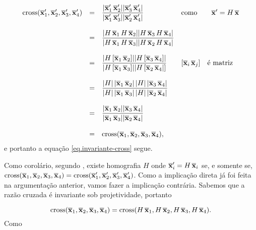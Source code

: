 \begin{equation*}
\begin{array}{rcll}
\text{cross}(\overline{\mathbf{x}}'_1,\overline{\mathbf{x}}'_2,\overline{\mathbf{x}}'_3,\overline{\mathbf{x}}'_4)&=&\displaystyle\frac{|\overline{\mathbf{x}}'_1\,\overline{\mathbf{x}}'_2||\overline{\mathbf{x}}'_3\,\overline{\mathbf{x}}'_4|}{|\overline{\mathbf{x}}'_1\,\overline{\mathbf{x}}'_3||\overline{\mathbf{x}}'_2\,\overline{\mathbf{x}}'_4|}&\text{como}\qquad\overline{\mathbf{x}}'=H\,\overline{\mathbf{x}}\\\\
&=&
\displaystyle\frac{|H\,\overline{\mathbf{x}}_1\,H\,\overline{\mathbf{x}}_2||H\,\overline{\mathbf{x}}_3\,H\,\overline{\mathbf{x}}_4|}{|H\,\overline{\mathbf{x}}_1\,H\,\overline{\mathbf{x}}_3||H\,\overline{\mathbf{x}}_2\,H\,\overline{\mathbf{x}}_4|}&\\\\
&=&
\displaystyle\frac{|H\,[\overline{\mathbf{x}}_1\,\overline{\mathbf{x}}_2]||H\,[\overline{\mathbf{x}}_3\,\overline{\mathbf{x}}_4]|}{|H\,[\overline{\mathbf{x}}_1\,\overline{\mathbf{x}}_3]||H\,[\overline{\mathbf{x}}_2\,\overline{\mathbf{x}}_4|]}&[\overline{\mathbf{x}}_i\,\overline{\mathbf{x}}_j]\quad\text{é matriz}      \\\\
&=&
\displaystyle\frac{|H|\,|\overline{\mathbf{x}}_1\,\overline{\mathbf{x}}_2|\,|H|\,|\overline{\mathbf{x}}_3\,\overline{\mathbf{x}}_4|}{|H|\,|\overline{\mathbf{x}}_1\,\overline{\mathbf{x}}_3|\,|H|\,|\overline{\mathbf{x}}_2\,\overline{\mathbf{x}}_4|}&\\\\
&=&
\displaystyle\frac{|\overline{\mathbf{x}}_1\,\overline{\mathbf{x}}_2||\overline{\mathbf{x}}_3\,\overline{\mathbf{x}}_4|}{|\overline{\mathbf{x}}_1\,\overline{\mathbf{x}}_3||\overline{\mathbf{x}}_2\,\overline{\mathbf{x}}_4|}&\\\\
&=&
\text{cross}(\overline{\mathbf{x}}_1,\overline{\mathbf{x}}_2,\overline{\mathbf{x}}_3,\overline{\mathbf{x}}_4),
\end{array}
\end{equation*}
e portanto a equação \ref{eq.invariante-cross} segue.

Como corolário, segundo \cite{kneebone}, existe homografia $H$ onde $\overline{\mathbf{x}}'_i=H\,\overline{\mathbf{x}}_i$ se, e somente se, $\text{cross}(\overline{\mathbf{x}}_1,\overline{\mathbf{x}}_2,\overline{\mathbf{x}}_3,\overline{\mathbf{x}}_4)=\text{cross}(\overline{\mathbf{x}}'_1,\overline{\mathbf{x}}'_2,\overline{\mathbf{x}}'_3,\overline{\mathbf{x}}'_4)$. Como a implicação direta já foi feita na argumentação anterior, vamos fazer a implicação contrária. Sabemos que a razão cruzada é invariante sob projetividade, portanto

\begin{equation*}
\text{cross}(\overline{\mathbf{x}}_1,\overline{\mathbf{x}}_2,\overline{\mathbf{x}}_3,\overline{\mathbf{x}}_4)=\text{cross}(H\,\overline{\mathbf{x}}_1,H\,\overline{\mathbf{x}}_2,H\,\overline{\mathbf{x}}_3,H\,\overline{\mathbf{x}}_4).
\end{equation*}
Como

